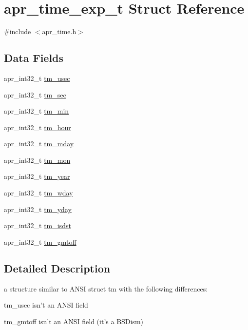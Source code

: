 \hypertarget{structapr__time__exp__t}{\section{apr\-\_\-time\-\_\-exp\-\_\-t Struct Reference}
\label{structapr__time__exp__t}
}


{\ttfamily \#include $<$apr\-\_\-time.\-h$>$}

\subsection*{Data Fields}
\begin{DoxyCompactItemize}
\item 
apr\-\_\-int32\-\_\-t \hyperlink{structapr__time__exp__t_ac5f11e3c1f5a30d357df2108296a8d30}{tm\-\_\-usec}
\item 
apr\-\_\-int32\-\_\-t \hyperlink{structapr__time__exp__t_a2c29c99a75b55237917cb05ebae6706c}{tm\-\_\-sec}
\item 
apr\-\_\-int32\-\_\-t \hyperlink{structapr__time__exp__t_a56a380db482ba5b2bef43351faad27fb}{tm\-\_\-min}
\item 
apr\-\_\-int32\-\_\-t \hyperlink{structapr__time__exp__t_a2dbab1d10ed6234c8e9e714e13b7911c}{tm\-\_\-hour}
\item 
apr\-\_\-int32\-\_\-t \hyperlink{structapr__time__exp__t_a6c09a274f011841e9e988c3c9504848a}{tm\-\_\-mday}
\item 
apr\-\_\-int32\-\_\-t \hyperlink{structapr__time__exp__t_a746f38956dfeb6be3bd17282791e3577}{tm\-\_\-mon}
\item 
apr\-\_\-int32\-\_\-t \hyperlink{structapr__time__exp__t_a35c32245be49279a6689e34bcd6e534a}{tm\-\_\-year}
\item 
apr\-\_\-int32\-\_\-t \hyperlink{structapr__time__exp__t_a57e892bbf3c52df34dcff2c6a9f1adbf}{tm\-\_\-wday}
\item 
apr\-\_\-int32\-\_\-t \hyperlink{structapr__time__exp__t_aa15c7ab0d7e2a974e89cc1470f1583ab}{tm\-\_\-yday}
\item 
apr\-\_\-int32\-\_\-t \hyperlink{structapr__time__exp__t_a4d899f1fb9fde3c6b6893941fa81b1c8}{tm\-\_\-isdst}
\item 
apr\-\_\-int32\-\_\-t \hyperlink{structapr__time__exp__t_a1102ca16ed70b1c707473431eed58d7b}{tm\-\_\-gmtoff}
\end{DoxyCompactItemize}


\subsection{Detailed Description}
a structure similar to A\-N\-S\-I struct tm with the following differences\-:
\begin{DoxyItemize}
\item tm\-\_\-usec isn't an A\-N\-S\-I field
\item tm\-\_\-gmtoff isn't an A\-N\-S\-I field (it's a B\-S\-Dism) 
\end{DoxyItemize}

